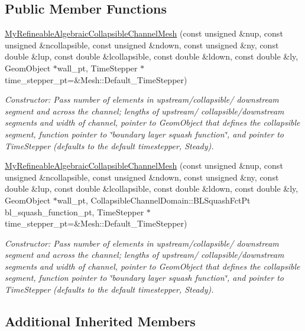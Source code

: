 \subsection*{Public Member Functions}
\begin{DoxyCompactItemize}
\item 
\hyperlink{classoomph_1_1MyRefineableAlgebraicCollapsibleChannelMesh_a79a68cc8d0515711e03a3a6e67d8b10f}{My\+Refineable\+Algebraic\+Collapsible\+Channel\+Mesh} (const unsigned \&nup, const unsigned \&ncollapsible, const unsigned \&ndown, const unsigned \&ny, const double \&lup, const double \&lcollapsible, const double \&ldown, const double \&ly, Geom\+Object $\ast$wall\+\_\+pt, Time\+Stepper $\ast$time\+\_\+stepper\+\_\+pt=\&Mesh\+::\+Default\+\_\+\+Time\+Stepper)
\begin{DoxyCompactList}\small\item\em Constructor\+: Pass number of elements in upstream/collapsible/ downstream segment and across the channel; lengths of upstream/ collapsible/downstream segments and width of channel, pointer to Geom\+Object that defines the collapsible segment, function pointer to \char`\"{}boundary layer squash function\char`\"{}, and pointer to Time\+Stepper (defaults to the default timestepper, Steady). \end{DoxyCompactList}\item 
\hyperlink{classoomph_1_1MyRefineableAlgebraicCollapsibleChannelMesh_a1a733580c1e040c6d546e6ec78d844ee}{My\+Refineable\+Algebraic\+Collapsible\+Channel\+Mesh} (const unsigned \&nup, const unsigned \&ncollapsible, const unsigned \&ndown, const unsigned \&ny, const double \&lup, const double \&lcollapsible, const double \&ldown, const double \&ly, Geom\+Object $\ast$wall\+\_\+pt, Collapsible\+Channel\+Domain\+::\+B\+L\+Squash\+Fct\+Pt bl\+\_\+squash\+\_\+function\+\_\+pt, Time\+Stepper $\ast$time\+\_\+stepper\+\_\+pt=\&Mesh\+::\+Default\+\_\+\+Time\+Stepper)
\begin{DoxyCompactList}\small\item\em Constructor\+: Pass number of elements in upstream/collapsible/ downstream segment and across the channel; lengths of upstream/ collapsible/downstream segments and width of channel, pointer to Geom\+Object that defines the collapsible segment, function pointer to \char`\"{}boundary layer squash function\char`\"{}, and pointer to Time\+Stepper (defaults to the default timestepper, Steady). \end{DoxyCompactList}\end{DoxyCompactItemize}
\subsection*{Additional Inherited Members}


